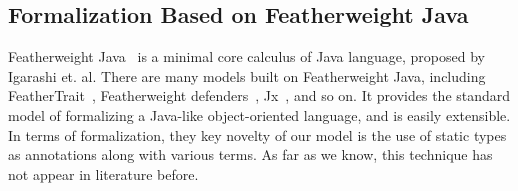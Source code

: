 \subsection{Formalization Based on Featherweight Java}
Featherweight Java~\cite{Igarashi01FJ} is a minimal core calculus of Java language, proposed by Igarashi et. al. There are
many models built on
Featherweight Java, including FeatherTrait~\cite{Liquori08ftj}, Featherweight defenders~\cite{goetz12fdefenders}, Jx~\cite{Nystrom2004}, and so on.
It provides the standard model of formalizing a Java-like object-oriented language, and 
is easily extensible. In terms of formalization, they key novelty of our model is the use of 
static types as annotations along with various terms. As far as we know, this technique has not appear in literature before.








